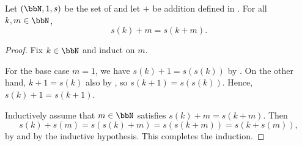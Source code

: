 \begin{lemma} \label{lemma:successor_left_addition}
Let $(\bbN, 1, s)$ be the set of  and let $+$ be addition defined in . For all $k, m \in \bbN$,
$$s(k) + m = s(k + m).$$
\end{lemma}

\begin{proof}
Fix $k \in \bbN$ and induct on $m$.

For the base case $m=1$, we have $s(k) + 1 = s(s(k))$ by . On the other hand, $k+1 = s(k)$ also by , so $s(k+1) = s(s(k))$. Hence, $s(k)+1 = s(k+1)$. 

Inductively assume that $m \in \bbN$ satisfies $s(k) + m = s(k+m)$. Then
$$s(k) + s(m) = s(s(k) + m) = s(s(k+m)) = s(k + s(m)),$$
by  and by the inductive hypothesis. This completes the induction.
\end{proof}
